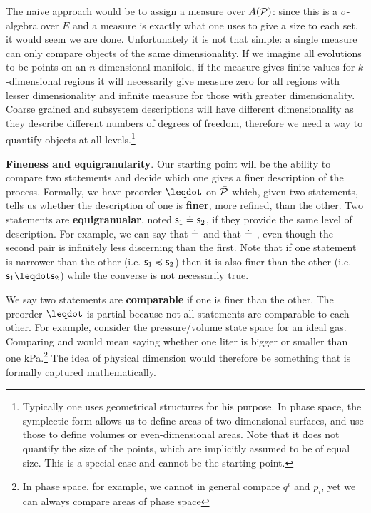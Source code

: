 \documentclass[10pt, onecolumn, longbibliography, nofootinbib]{revtex4-2}
\begin{document}
The naive approach would be to assign a measure over $A(\tdomain[P])$: since this is a $\sigma$-algebra over $E$ and a measure is exactly what one uses to give a size to each set, it would seem we are done. Unfortunately it is not that simple: a single measure can only compare objects of the same dimensionality. If we imagine all evolutions to be points on an $n$-dimensional manifold, if the measure gives finite values for $k$-dimensional regions it will necessarily give measure zero for all regions with lesser dimensionality and infinite measure for those with greater dimensionality. Coarse grained and subsystem descriptions will have different dimensionality as they describe different numbers of degrees of freedom, therefore we need a way to quantify objects at all levels.\footnote{Typically one uses geometrical structures for his purpose. In phase space, the symplectic form allows us to define areas of two-dimensional surfaces, and use those to define volumes or even-dimensional areas. Note that it does not quantify the size of the points, which are implicitly assumed to be of equal size. This is a special case and cannot be the starting point.}

\textbf{Fineness and equigranularity}. Our starting point will be the ability to compare two statements and decide which one gives a finer description of the process. Formally, we have preorder $\finer$ on $\tdomain[P]$ which, given two statements, tells us whether the description of one is \textbf{finer}, more refined, than the other. Two statements are \textbf{equigranualar}, noted $\stmt_1 \eqgran \stmt_2$, if they provide the same level of description. For example, we can say that  $\eqgran$  and that  $\eqgran$ , even though the second pair is infinitely less discerning than the first. Note that if one statement is narrower than the other (i.e. $\stmt_1 \narrower \stmt_2$) then it is also finer than the other (i.e. $\stmt_1 \finer \stmt_2$) while the converse is not necessarily true. 

We say two statements are \textbf{comparable} if one is finer than the other. The preorder $\finer$ is partial because not all statements are comparable to each other. For example, consider the pressure/volume state space for an ideal gas. Comparing  and  would mean saying whether one liter is bigger or smaller than one kPa.\footnote{In phase space, for example, we cannot in general compare $q^i$ and $p_i$, yet we can always compare areas of phase space} The idea of physical dimension would therefore be something that is formally captured mathematically.
\end{document}
